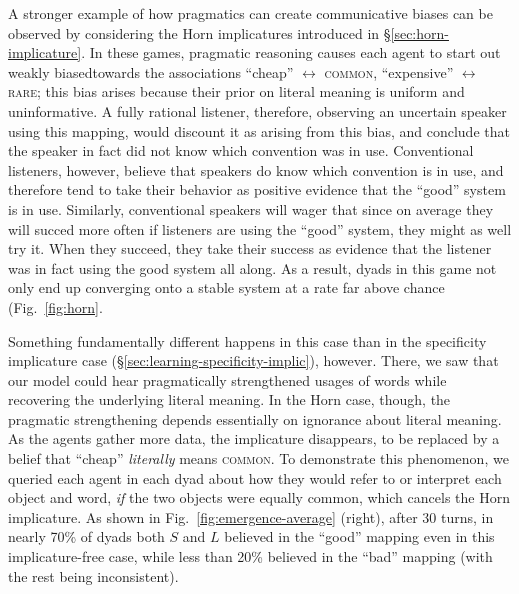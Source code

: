 \documentclass{article} %
\begin{document}
A stronger example of how pragmatics can create communicative biases can be
observed by considering the Horn implicatures introduced in \S\ref{sec:horn-implicature}. 
In these games, pragmatic reasoning causes each agent to start out weakly biasedtowards the associations ``cheap'' $\leftrightarrow$
\textsc{common}, ``expensive'' $\leftrightarrow$ \textsc{rare}; this bias arises because their prior on literal meaning
is uniform and uninformative. A fully rational listener, therefore,
observing an uncertain speaker using this mapping, would discount it
as arising from this bias, and conclude that the speaker in fact did
not know which convention was in use. Conventional listeners,
however, believe that speakers do know which convention is in
use, and therefore tend to take their behavior as positive evidence that the
``good'' system is in use. Similarly, conventional speakers
will wager that since on average they will succed more often if
listeners are using the ``good'' system, they might as well try
it. When they succeed, they take their success as evidence that the listener was in
fact using the good system all along. As a result, dyads in this game
not only end up converging onto a stable system at a rate far above
chance (Fig.~\ref{fig:horn}. 

Something
fundamentally different happens in this case than in the specificity
implicature case (\S\ref{sec:learning-specificity-implic}), however. There, we
saw that our model could hear pragmatically strengthened usages
of words while recovering the underlying literal meaning. In the Horn
case, though, the pragmatic strengthening depends essentially on
ignorance about literal meaning. As the agents gather more data,
the implicature disappears, to be replaced by a belief that
``cheap'' \textit{literally} means \textsc{common}. To demonstrate
this phenomenon, we queried each agent in each dyad about how they would refer to
or interpret each object and word, \textit{if} the two objects were
equally common, which cancels the Horn implicature. As shown in
Fig.~\ref{fig:emergence-average} (right), after 30 turns, in nearly 70\%
of dyads both $S$ and $L$ believed in the ``good'' mapping even in
this implicature-free case, while less than 20\% believed in the
``bad'' mapping (with the rest being inconsistent).

%
\end{document}
